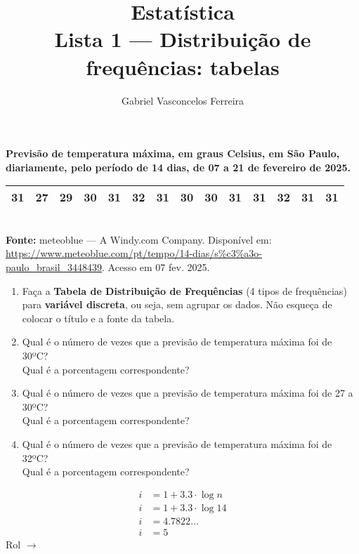 \documentclass{jhwhw}
\begin{document}
\author{Gabriel Vasconcelos Ferreira}
\title{%
    Estatística\\Lista 1 --- Distribuição de frequências: tabelas 
}
\maketitle    
{}
\begin{center}
    \textbf{Previsão de temperatura máxima, em graus Celsius, em São Paulo, diariamente, pelo período de 14 dias, de 07 a 21 de fevereiro de 2025.}
    \begin{tabular}{llllllllllllll}
        \hline 31 & 27 & 29 & 30 & 31 & 32 & 31 & 30 & 30 & 31 & 31 & 32 & 31 & 31 \\
        \hline
    \end{tabular}\\
    \textbf{Fonte:} meteoblue --- A Windy.com Company. Disponível em: \url{https://www.meteoblue.com/pt/tempo/14-dias/s\%c3\%a3o-paulo\_brasil\_3448439}. Acesso em 07 fev. 2025.
\end{center}
\begin{enumerate}[label=\alph*)]
    \item Faça a \textbf{Tabela de Distribuição de Frequências} (4 tipos de frequências) para \textbf{variável discreta}, ou seja, sem agrupar os dados. Não esqueça de colocar o título e a fonte da tabela.
    \item Qual é o número de vezes que a previsão de temperatura máxima foi de 30ºC?\\Qual é a porcentagem correspondente?
    \item Qual é o número de vezes que a previsão de temperatura máxima foi de 27 a 30ºC?\\Qual é a porcentagem correspondente?
    \item Qual é o número de vezes que a previsão de temperatura máxima foi de 32ºC?\\Qual é a porcentagem correspondente?
\end{enumerate}

\newpage
{}
\begin{align*}
    i &= 1 + 3.3 \cdot \log{n}\\
    i &= 1 + 3.3 \cdot \log{14}\\
    i &= 4.7822\dots\\
    i &= \boxed{5}
\end{align*}
Rol $\rightarrow$ 
\end{document}
